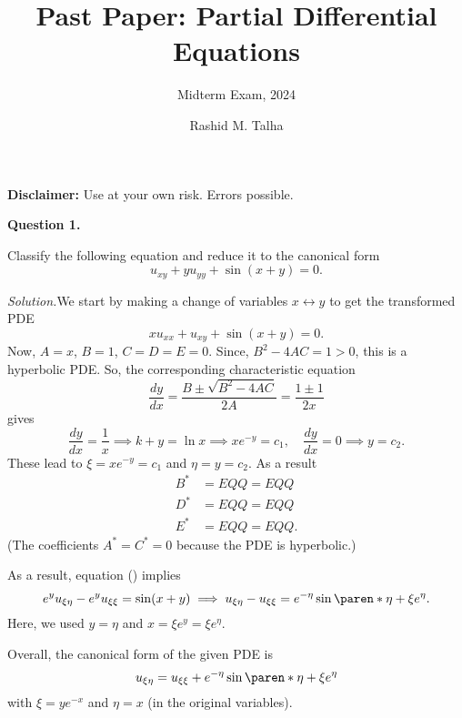 \documentclass[11pt]{penrose}
\title{Past Paper: Partial Differential Equations}
\subtitle{Midterm Exam, 2024}
\author{Rashid M. Talha}
\begin{document}
\newenvironment{problem}[2][Question]{\textbf{#1 #2.}\par}{}
\newcommand{\solution}{\textit{Solution.}\hspace{2mm}}

\maketitle

\textbf{Disclaimer:} Use at your own risk. Errors possible.

\begin{problem}{1}
    Classify the following equation and reduce it to the canonical form
    \begin{equation*}
        u_{xy} + y u_{yy} + \sin(x+y) = 0.
    \end{equation*}

    \solution We start by making a change of variables $x \leftrightarrow y$ to get the transformed PDE
    \begin{equation*}
        x u_{xx} + u_{xy} + \sin(x+y) = 0. \tag{\textasteriskcentered}
    \end{equation*}
    Now, $A = x$, $B = 1$, $C = D = E = 0$. Since, $B^2 - 4AC = 1 > 0$, this is a hyperbolic PDE. So, the corresponding characteristic equation
    \begin{equation*}
        \frac{dy}{dx} = \frac{B \pm \sqrt{B^2 - 4AC}}{2A} = \frac{1 \pm 1}{2x}
    \end{equation*}
    gives
    \begin{equation*}
        \frac{dy}{dx} = \frac{1}{x} \implies k + y = \ln x \implies x e^{-y} = c_1, \quad
        \frac{dy}{dx} = 0 \implies y = c_2.
    \end{equation*}
    These lead to $\xi = x e^{-y} = c_1$ and $\eta = y = c_2$. As a result
    \begin{align*}
        B^{*} &= EQQ = EQQ\\
        D^{*} &= EQQ = EQQ\\
        E^{*} &= EQQ = EQQ.
    \end{align*}
    (The coefficients $A^{*} = C^{*} = 0$ because the PDE is hyperbolic.)

    As a result, equation (\textasteriskcentered) implies
    \begin{equation*}
        e^{y} u_{\xi\eta} - e^{y} u_{\xi\xi} = \sin(x + y)
        \implies u_{\xi\eta} - u_{\xi\xi} = e^{-\eta}\sin\paren*{\eta + \xi e^\eta}.
    \end{equation*}
    Here, we used $y = \eta$ and $x = \xi e^y = \xi e^\eta$.

    Overall, the canonical form of the given PDE is
    \begin{equation*}
        u_{\xi\eta} = u_{\xi\xi} + e^{-\eta}\sin\paren*{\eta + \xi e^\eta}
    \end{equation*}
    with $\xi = y e^{-x}$ and $\eta = x$ (in the original variables).
\end{problem}
\end{document}

